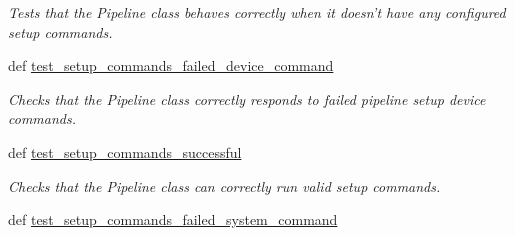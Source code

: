 \begin{DoxyCompactItemize}
\begin{DoxyCompactList}\small\item\em Tests that the Pipeline class behaves correctly when it doesn't have any configured setup commands. \end{DoxyCompactList}\item 
\hypertarget{classhwm_1_1hardware_1_1pipelines_1_1tests_1_1test__pipeline_1_1_test_pipeline_af9f987be980cd1bdbe6b6ab414c1b762}{def \hyperlink{classhwm_1_1hardware_1_1pipelines_1_1tests_1_1test__pipeline_1_1_test_pipeline_af9f987be980cd1bdbe6b6ab414c1b762}{test\-\_\-setup\-\_\-commands\-\_\-failed\-\_\-device\-\_\-command}}\label{classhwm_1_1hardware_1_1pipelines_1_1tests_1_1test__pipeline_1_1_test_pipeline_af9f987be980cd1bdbe6b6ab414c1b762}

\begin{DoxyCompactList}\small\item\em Checks that the Pipeline class correctly responds to failed pipeline setup device commands. \end{DoxyCompactList}\item 
\hypertarget{classhwm_1_1hardware_1_1pipelines_1_1tests_1_1test__pipeline_1_1_test_pipeline_a70b13b33a4e12d978c612c930d6a5c21}{def \hyperlink{classhwm_1_1hardware_1_1pipelines_1_1tests_1_1test__pipeline_1_1_test_pipeline_a70b13b33a4e12d978c612c930d6a5c21}{test\-\_\-setup\-\_\-commands\-\_\-successful}}\label{classhwm_1_1hardware_1_1pipelines_1_1tests_1_1test__pipeline_1_1_test_pipeline_a70b13b33a4e12d978c612c930d6a5c21}

\begin{DoxyCompactList}\small\item\em Checks that the Pipeline class can correctly run valid setup commands. \end{DoxyCompactList}\item 
\hypertarget{classhwm_1_1hardware_1_1pipelines_1_1tests_1_1test__pipeline_1_1_test_pipeline_a14a19a3d52356903ed58e185fadbe456}{def \hyperlink{classhwm_1_1hardware_1_1pipelines_1_1tests_1_1test__pipeline_1_1_test_pipeline_a14a19a3d52356903ed58e185fadbe456}{test\-\_\-setup\-\_\-commands\-\_\-failed\-\_\-system\-\_\-command}}\label{classhwm_1_1hardware_1_1pipelines_1_1tests_1_1test__pipeline_1_1_test_pipeline_a14a19a3d52356903ed58e185fadbe456}


\end{DoxyCompactItemize}
